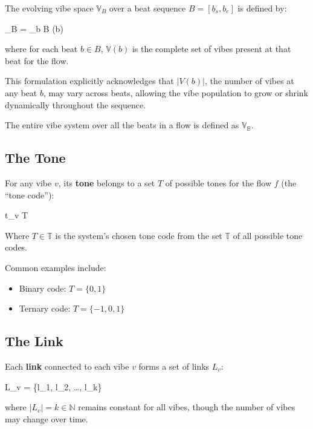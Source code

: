 \documentclass{article}
\let\oldequation\equation
\let\endoldequation\endequation
\renewenvironment{equation}{%
    \noindent\vspace{-\parskip}\vspace{-\baselineskip}%
    \oldequation
}{%
    \endoldequation
    \noindent\vspace{-\parskip}\vspace{-\baselineskip}%
}
\theoremstyle{definition}
\theoremstyle{axiom}
\theoremstyle{theorem}
\theoremstyle{lemma}
\theoremstyle{proposition}
\begin{document}
The evolving vibe space $\mathbb{V}_B$ over a beat sequence $B = [b_s, b_e]$ is defined by:

\begin{equation}
    _B = \bigcup_{b \in B} (b)
\end{equation}

where for each beat $b \in B$, $\mathbb{V}(b)$ is the complete set of vibes present at that beat for the flow.

This formulation explicitly acknowledges that $|V(b)|$, the number of vibes at any beat $b$, may vary across beats, allowing the vibe population to grow or shrink dynamically throughout the sequence.

The entire vibe system over all the beats in a flow is defined as $\mathbb{V}_\mathbb{B}$.

\subsection{The Tone}

For any vibe $v$, its \textbf{tone} belongs to a set $T$ of possible tones for the flow $f$ (the \enquote{tone code}):

\begin{equation}
    t_v \in T
\end{equation}

Where $T \in \mathbb{T}$ is the system's chosen tone code from the set $\mathbb{T}$ of all possible tone codes.

Common examples include:

\begin{itemize}
    \item Binary code: $T = \{0, 1\}$
    \item Ternary code: $T = \{-1, 0, 1\}$
\end{itemize}

\subsection{The Link}

Each \textbf{link} connected to each vibe $v$ forms a set of links $L_v$:

\begin{equation}
    L_v = \{l_1, l_2, \ldots, l_k\}
\end{equation}

where $|L_v| = k \in \mathbb{N}$ remains constant for all vibes, though the number of vibes may change over time.
\end{document}
